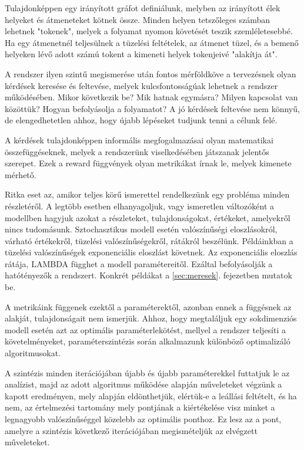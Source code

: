 Tulajdonképpen egy irányított gráfot definiálunk, melyben az irányított élek helyeket és átmeneteket kötnek össze. Minden helyen tetszőleges számban lehetnek "tokenek", melyek a folyamat nyomon követését teszik szemléletesebbé. Ha egy átmenetnél teljesülnek a tüzelési feltételek, az átmenet tüzel, és a bemenő helyeken lévő adott számú tokent a kimeneti helyek tokenjeivé "alakítja át".

A rendszer ilyen szintű megismerése után fontos mérföldköve a tervezésnek olyan kérdések keresése és feltevése, melyek kulcsfontosságúak lehetnek a rendszer működésében. Mikor következik be? Mik hatnak egymásra? Milyen kapcsolat van közöttük? Hogyan befolyásolja a folyamatot? A jó kérdések feltevése nem könnyű, de elengedhetetlen ahhoz, hogy újabb lépéseket tudjunk tenni a célunk felé.

A kérdések tulajdonképpen informális megfogalmazásai olyan matematikai összefüggéseknek, melyek a rendszerünk viselkedésében játszanak jelentős szerepet. Ezek a reward függvények olyan metrikákat írnak le, melyek kimenete mérhető. 

Ritka eset az, amikor teljes körű ismerettel rendelkezünk egy probléma minden részletéről. A legtöbb esetben elhanyagoljuk, vagy ismeretlen változóként a modellben hagyjuk azokat a részleteket, tulajdonságokat, értékeket, amelyekről nincs tudomásunk. 
Sztochasztikus modell esetén valószínűségi eloszlásokról, várható értékekről, tüzelési valószínűségekről, rátákról beszélünk. Példáinkban a tüzelési valószínűségek exponenciális eloszlást követnek. Az exponenciális eloszlás rátája, LAMBDA %
függhet a modell paramétereitől. Ezáltal befolyásolják a hatótényezők a rendszert. Konkrét példákat a \ref{sec:meresek}. fejezetben mutatok be.

A metrikáink függenek ezektől a paraméterektől, azonban ennek a függésnek az alakját, tulajdonságait nem ismerjük. Ahhoz, hogy megtaláljuk egy sokdimenziós modell esetén azt az optimális paraméterlekötést, mellyel a rendszer teljesíti a követelményeket, paraméterszintézis során alkalmazunk különböző optimalizáló algoritmusokat.

A szintézis minden iterációjában újabb és újabb paraméterekkel futtatjuk le az analízist, majd az adott algoritmus működése alapján műveleteket végzünk a kapott eredményen, mely alapján eldönthetjük, elértük-e a leállási feltételt, és ha nem, az értelmezési tartomány mely pontjának a kiértékelése visz minket a legnagyobb valószínűséggel közelebb az optimális ponthoz. Ez lesz az a pont, amelyre a szintézis következő iterációjában megismételjük az elvégzett műveleteket.

